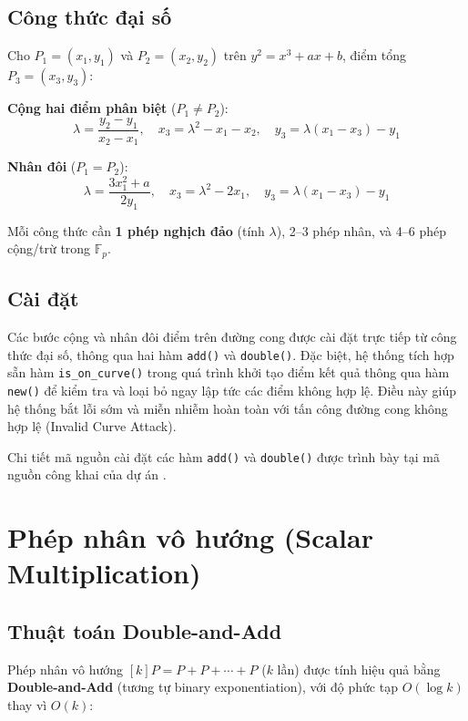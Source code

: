 \subsection{Công thức đại
số}\label{cuxf4ng-thux1ee9c-ux111ux1ea1i-sux1ed1}

Cho \(P_1 = (x_1, y_1)\) và \(P_2 = (x_2, y_2)\) trên
\(y^2 = x^3 + ax + b\), điểm tổng \(P_3 = (x_3, y_3)\):

\textbf{Cộng hai điểm phân biệt} (\(P_1 \neq P_2\)):
\[\lambda = \frac{y_2 - y_1}{x_2 - x_1}, \quad x_3 = \lambda^2 - x_1 - x_2, \quad y_3 = \lambda(x_1 - x_3) - y_1\]

\textbf{Nhân đôi} (\(P_1 = P_2\)):
\[\lambda = \frac{3x_1^2 + a}{2y_1}, \quad x_3 = \lambda^2 - 2x_1, \quad y_3 = \lambda(x_1 - x_3) - y_1\]

Mỗi công thức cần \textbf{1 phép nghịch đảo} (tính \(\lambda\)), 2--3
phép nhân, và 4--6 phép cộng/trừ trong \(\mathbb{F}_p\).

\subsection{Cài đặt}\label{cuxe0i-ux111ux1eb7t}

Các bước cộng và nhân đôi điểm trên đường cong được cài đặt trực tiếp từ
công thức đại số, thông qua hai hàm \texttt{add()} và \texttt{double()}.
Đặc biệt, hệ thống tích hợp sẵn hàm \texttt{is\_on\_curve()} trong quá
trình khởi tạo điểm kết quả thông qua hàm \texttt{new()} để kiểm tra và
loại bỏ ngay lập tức các điểm không hợp lệ. Điều này giúp hệ thống bắt
lỗi sớm và miễn nhiễm hoàn toàn với tấn công đường cong không hợp lệ
(Invalid Curve Attack).

Chi tiết mã nguồn cài đặt các hàm \texttt{add()} và \texttt{double()}
được trình bày tại mã nguồn công khai của dự án \citep{LumenMath}.

\section{Phép nhân vô hướng (Scalar
Multiplication)}\label{phuxe9p-nhuxe2n-vuxf4-hux1b0ux1edbng-scalar-multiplication}

\subsection{Thuật toán
Double-and-Add}\label{thuux1eadt-touxe1n-double-and-add}

Phép nhân vô hướng \([k]P = P + P + \cdots + P\) (\(k\) lần) được tính
hiệu quả bằng \textbf{Double-and-Add} (tương tự binary exponentiation),
với độ phức tạp \(O(\log k)\) thay vì \(O(k)\):

